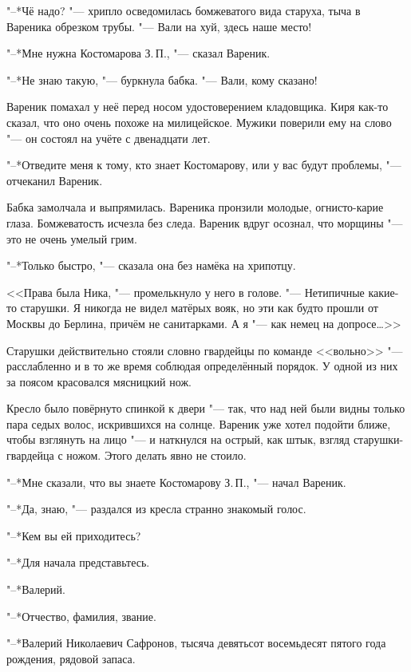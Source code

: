 "--*Чё надо? "--- хрипло осведомилась бомжеватого вида старуха, тыча в Вареника обрезком трубы.
"--- Вали на хуй, здесь наше место!

"--*Мне нужна Костомарова З.\,П., "--- сказал Вареник.

"--*Не знаю такую, "--- буркнула бабка.
"--- Вали, кому сказано!

Вареник помахал у неё перед носом удостоверением кладовщика.
Киря как-то сказал, что оно очень похоже на милицейское.
Мужики поверили ему на слово "--- он состоял на учёте с двенадцати лет.

"--*Отведите меня к тому, кто знает Костомарову, или у вас будут проблемы, "--- отчеканил Вареник.

Бабка замолчала и выпрямилась.
Вареника пронзили молодые, огнисто-карие глаза.
Бомжеватость исчезла без следа.
Вареник вдруг осознал, что морщины "--- это не очень умелый грим.

"--*Только быстро, "--- сказала она без намёка на хрипотцу.

\asterism

\textspace

<<Права была Ника, "--- промелькнуло у него в голове.
"--- Нетипичные какие-то старушки.
Я никогда не видел матёрых вояк, но эти как будто прошли от Москвы до Берлина, причём не санитарками.
А я "--- как немец на допросе\dots>>

Старушки действительно стояли словно гвардейцы по команде <<вольно>> "--- расслабленно и в то же время соблюдая определённый порядок.
У одной из них за поясом красовался мясницкий нож.

Кресло было повёрнуто спинкой к двери "--- так, что над ней были видны только пара седых волос, искрившихся на солнце.
Вареник уже хотел подойти ближе, чтобы взглянуть на лицо "--- и наткнулся на острый, как штык, взгляд старушки-гвардейца с ножом.
Этого делать явно не стоило.

"--*Мне сказали, что вы знаете Костомарову З.\,П., "--- начал Вареник.

"--*Да, знаю, "--- раздался из кресла странно знакомый голос.

"--*Кем вы ей приходитесь?

"--*Для начала представьтесь.

"--*Валерий.

"--*Отчество, фамилия, звание.

"--*Валерий Николаевич Сафронов, тысяча девятьсот восемьдесят пятого года рождения, рядовой запаса.

